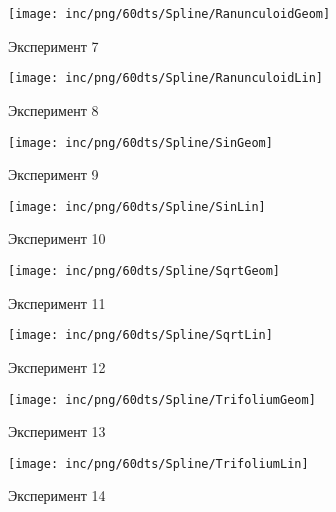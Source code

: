 \begin{figure}  
	\begin{minipage}{0,5\textwidth}
		\texttt{[image: inc/png/60dts/Spline/RanunculoidGeom]}
		\label{fig:app1}
		\caption{Эксперимент 7}
	\end{minipage}
	\begin{minipage}{0,5\textwidth}
		\texttt{[image: inc/png/60dts/Spline/RanunculoidLin]}
		\label{fig:app2}
		\caption{Эксперимент 8}
	\end{minipage}
	
	\begin{minipage}{0,5\textwidth}
		\texttt{[image: inc/png/60dts/Spline/SinGeom]}
		\label{fig:app1}
		\caption{Эксперимент 9}
	\end{minipage}
	\begin{minipage}{0,5\textwidth}
		\texttt{[image: inc/png/60dts/Spline/SinLin]}
		\label{fig:app2}
		\caption{Эксперимент 10}
	\end{minipage}
	
	\begin{minipage}{0,5\textwidth}
		\texttt{[image: inc/png/60dts/Spline/SqrtGeom]}
		\label{fig:app1}
		\caption{Эксперимент 11}
	\end{minipage}
	\begin{minipage}{0,5\textwidth}
		\texttt{[image: inc/png/60dts/Spline/SqrtLin]}
		\label{fig:app2}
		\caption{Эксперимент 12}
	\end{minipage}
	
	\begin{minipage}{0,5\textwidth}
		\texttt{[image: inc/png/60dts/Spline/TrifoliumGeom]}
		\label{fig:app1}
		\caption{Эксперимент 13}
	\end{minipage}
	\begin{minipage}{0,5\textwidth}
		\texttt{[image: inc/png/60dts/Spline/TrifoliumLin]}
		\label{fig:app2}
		\caption{Эксперимент 14}
	\end{minipage}
\end{figure}
\clearpage
